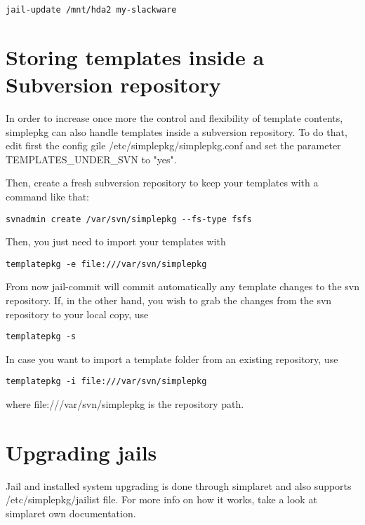 \documentclass{article}
\begin{document}
\begin{verbatim}
jail-update /mnt/hda2 my-slackware
\end{verbatim}

\section{Storing templates inside a Subversion repository}

In order to increase once more the control and flexibility of template contents, simplepkg can also handle templates inside a subversion repository. To do that, edit first the config gile /etc/simplepkg/simplepkg.conf and set the parameter TEMPLATES\_UNDER\_SVN to "yes".

Then, create a fresh subversion repository to keep your templates with a command like that:

\begin{verbatim}
svnadmin create /var/svn/simplepkg --fs-type fsfs
\end{verbatim}

Then, you just need to import your templates with

\begin{verbatim}
templatepkg -e file:///var/svn/simplepkg
\end{verbatim}

From now jail-commit will commit automatically any template changes to the svn repository. If, in the other hand, you wish to grab the changes from the svn repository to your local copy, use

\begin{verbatim}
templatepkg -s
\end{verbatim}

In case you want to import a template folder from an existing repository, use

\begin{verbatim}
templatepkg -i file:///var/svn/simplepkg
\end{verbatim}

where file:///var/svn/simplepkg is the repository path.

\section{Upgrading jails}

Jail and installed system upgrading is done through simplaret and also supports /etc/simplepkg/jailist file.
For more info on how it works, take a look at simplaret own documentation.
\end{document}
